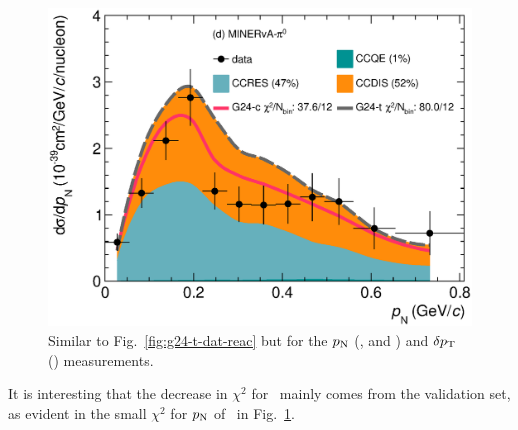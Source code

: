 \begin{figure}
        \includegraphics[width=\dbfigwid\textwidth]{figures/tuning/0013-min_pi0_pn_reac_decomp.eps}
        \caption{\label{fig:g24-t-pn-reac}  
        Similar to Fig.~\ref{fig:g24-t-dat-reac} but for the $p_\textrm{N}$ (\ttkpip, \minzpi and \minpiz) and $\delta p_\textrm{T}$ (\ttkzpi) measurements. 
        } 
    \end{figure}
    It is interesting that the decrease in $\chi^2$ for \gT\ mainly comes from the validation set, as evident in the small $\chi^2$ for $p_\textrm{N}$ of \minzpi\ in Fig.~\ref{fig:g24-t-pn-reac}.

